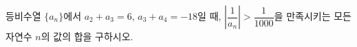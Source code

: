 등비수열 $\{a_n\}$에서 $a_2+a_3=6$, $a_3+a_4=-18$일 때, $\left|\dfrac{1}{a_n}\right|>\dfrac{1}{1000}$을 만족시키는 모든 자연수 $n$의 값의 합을 구하시오.
